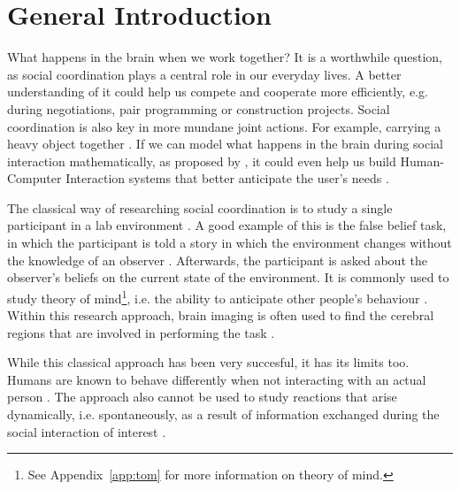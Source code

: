 
\section{General Introduction}

What happens in the brain when we work together? It is a worthwhile question, as
social coordination plays a central role in our everyday lives. A better
understanding of it could help us compete and cooperate more efficiently, e.g.
during negotiations, pair programming or construction projects. Social
coordination is also key in more mundane joint actions. For example, carrying a
heavy object together \parencite{sebanz_joint_2006}. If we can model what
happens in the brain during social interaction mathematically, as proposed by
\textcite{koike_hyperscanning_2015}, it could even help us build Human-Computer
Interaction systems that better anticipate the user's needs \parencite{tan_enhancing_2010}.

The classical way of researching social coordination is to study a single
participant in a lab environment
\parencite{hasson_brain--brain_2012,babiloni_social_2014}. A good example of
this is the false belief task, in which the participant is told a story in which
the environment changes without the knowledge of an observer
\parencite[p.~458]{postle_essentials_2020}. Afterwards, the participant is asked
about the observer's beliefs on the current state of the environment. It is
commonly used to study theory of mind\footnote{See Appendix~\ref{app:tom} for
more information on theory of mind.}, i.e. the ability to anticipate other
people's behaviour \parencite[p.~457]{postle_essentials_2020}. Within this
research approach, brain imaging is often used to find the cerebral regions that
are involved in performing the task \parencite{babiloni_social_2014}.

While this classical approach has been very succesful, it has its limits too.
Humans are known to behave differently when not interacting with an actual
person \parencite{babiloni_social_2014,rilling_neural_2004,rilling_neuroscience_2011}.
The approach also cannot be used to study reactions that arise dynamically, i.e.
spontaneously, as a result of information exchanged during the social
interaction of interest \parencite{babiloni_social_2014, czeszumski_hyperscanning_2020}.

